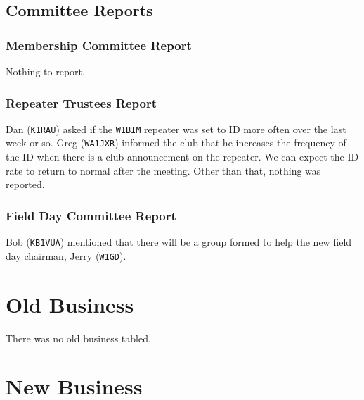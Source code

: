 \documentclass[10pt,letterpaper]{article}
\begin{document}
\subsection{Committee Reports}

\subsubsection{Membership Committee Report}

Nothing to report.

\subsubsection{Repeater Trustees Report}

Dan (\texttt{K1RAU}) asked if the \texttt{W1BIM} repeater was set to ID more often over the last week or so. Greg (\texttt{WA1JXR}) informed the club that he increases the frequency of the ID when there is a club announcement on the repeater. We can expect the ID rate to return to normal after the meeting. Other than that, nothing was reported.

\subsubsection{Field Day Committee Report}

Bob (\texttt{KB1VUA}) mentioned that there will be a group formed to help the new field day chairman, Jerry (\texttt{W1GD}).

\section{Old Business}

There was no old business tabled.

\section{New Business}
\end{document}
